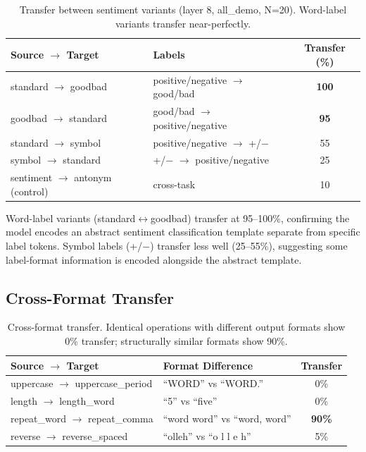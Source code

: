 \documentclass{article}
\begin{document}
\begin{table}[h]
\centering
\small
\caption{Transfer between sentiment variants (layer 8, all\_demo, N=20). Word-label variants transfer near-perfectly.}
\label{tab:sentiment_variants}
\begin{tabular}{@{}llc@{}}
\toprule
Source $\to$ Target & Labels & Transfer (\%) \\
\midrule
standard $\to$ goodbad & positive/negative $\to$ good/bad & \textbf{100} \\
goodbad $\to$ standard & good/bad $\to$ positive/negative & \textbf{95} \\
standard $\to$ symbol & positive/negative $\to$ +/$-$ & 55 \\
symbol $\to$ standard & +/$-$ $\to$ positive/negative & 25 \\
\midrule
sentiment $\to$ antonym (control) & cross-task & 10 \\
\bottomrule
\end{tabular}
\end{table}

Word-label variants (standard$\leftrightarrow$goodbad) transfer at 95--100\%, confirming the model encodes an abstract sentiment classification template separate from specific label tokens. Symbol labels (+/$-$) transfer less well (25--55\%), suggesting some label-format information is encoded alongside the abstract template.

\subsection{Cross-Format Transfer}

\begin{table}[h]
\caption{Cross-format transfer. Identical operations with different output formats show 0\% transfer; structurally similar formats show 90\%.}
\label{tab:format}
\centering
\small
\begin{tabular}{@{}llc@{}}
\toprule
Source $\to$ Target & Format Difference & Transfer \\
\midrule
uppercase $\to$ uppercase\_period & ``WORD'' vs ``WORD.'' & 0\% \\
length $\to$ length\_word & ``5'' vs ``five'' & 0\% \\
repeat\_word $\to$ repeat\_comma & ``word word'' vs ``word, word'' & \textbf{90\%} \\
reverse $\to$ reverse\_spaced & ``olleh'' vs ``o l l e h'' & 5\% \\
\bottomrule
\end{tabular}
\end{table}
\end{document}
